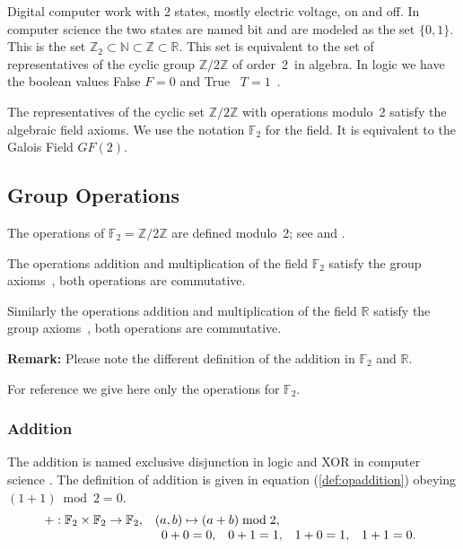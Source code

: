 \documentclass[a4paper]{article}
\newcommand{\BF}{\mathbb{F}}
\newcommand{\BN}{\mathbb{N}}
\newcommand{\BR}{\mathbb{R}}
\newcommand{\BZ}{\mathbb{Z}}
\newcommand{\0}{\mathbf{0}}
\newcommand{\1}{\mathbf{1}}
\begin{document}
Digital computer work with 2 states, mostly electric voltage, on and off. In computer science the two states are named bit and
are modeled as the set $\{0, 1\}$. This is the set $\BZ_2 \subset \BN \subset \BZ \subset \BR$.
This set is equivalent to the set of representatives of the cyclic group $\BZ/2\BZ$ of order~2~in algebra.
In logic we have the boolean values False $F = 0$ and True~ $T = 1$~\cite{knuth:taocp_v4_f0}.

The representatives of the cyclic set $\BZ/2\BZ$ with operations modulo~2 satisfy the algebraic field axioms.
We use the notation $\BF_2$ for the field. It is equivalent to the Galois Field $GF(2)$.

\subsection{Group Operations}
The operations of $\BF_2 = \BZ/2\BZ$ are defined modulo~2; see \cite[ch. 2.2.6]{Fischer2020} and \cite{Hill2004}.

The operations addition and multiplication of the field $\BF_2$ satisfy the group
axioms~\cite{Fischer2020, Lidl2000, wikipedia_en_2026_GroupMathematics}, both operations are commutative.

Similarly the operations addition and multiplication of the field $\BR$ satisfy the group
axioms~\cite{Fischer2020}, both operations are commutative.

{\bf Remark:} Please note the different definition of the addition in $\BF_2$ and $\BR$.

For reference we give here only the operations for $\BF_2$.

\subsubsection{Addition}
The addition is named exclusive disjunction in logic and XOR 
in computer science
\cite{knuth:taocp_v4_f0, wikipedia_en_2025_ExclusiveOr}.
The definition of addition is given in equation (\ref{def:opaddition}) obeying $(1+1) \bmod 2 = 0$.
\begin{equation}
\begin{array}{ll}
+ : \BF_2 \times \BF_2 \to \BF_2, & (a,b) \mapsto (a + b) \bmod 2, \\
& \begin{array}{l l l l}
0 + 0 = 0, & 0 + 1 = 1, & 1 + 0 = 1, & 1 + 1 = 0.
\end{array}
\end{array}
\label{def:opaddition}
\end{equation}
\end{document}
